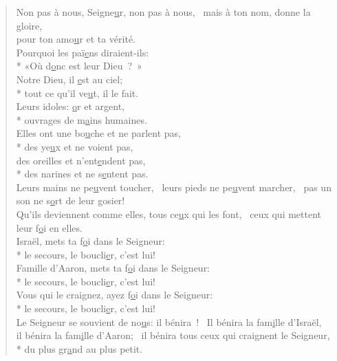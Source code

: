 \begin{verse}
Non pas à nous, Seigne\underline{u}r, non pas à nous,~\psalmstar
mais à ton nom, donne la gloire, \\
pour ton amo\underline{u}r et ta vérité. \\

Pourquoi les paï\underline{e}ns diraient-ils: \\*
«Où d\underline{o}nc est leur Dieu ? » \\

Notre Dieu, il \underline{e}st au ciel; \\*
tout ce qu’il ve\underline{u}t, il le fait. \\
Leurs idoles: \underline{o}r et argent, \\*
ouvrages de m\underline{a}ins humaines. \\

Elles ont une bo\underline{u}che et ne parlent pas, \\*
des ye\underline{u}x et ne voient pas, \\
des oreilles et n’ent\underline{e}ndent pas, \\*
des narines et ne s\underline{e}ntent pas. \\

Leurs mains ne pe\underline{u}vent toucher,~\psalmdagger
leurs pieds ne pe\underline{u}vent marcher,~\psalmstar
pas un son ne s\underline{o}rt de leur gosier! \\

Qu’ils deviennent comme elles, tous ce\underline{u}x qui les font,~\psalmstar
ceux qui mettent leur f\underline{o}i en elles. \\

Israël, mets ta f\underline{o}i dans le Seigneur: \\*
le secours, le boucli\underline{e}r, c’est lui! \\
Famille d’Aaron, mets ta f\underline{o}i dans le Seigneur: \\*
le secours, le boucli\underline{e}r, c’est lui! \\
Vous qui le craignez, ayez f\underline{o}i dans le Seigneur: \\*
le secours, le boucli\underline{e}r, c’est lui! \\

Le Seigneur se souvient de no\underline{u}s: il bénira !~\psalmstar
Il bénira la fam\underline{i}lle d’Israël, \\
il bénira la fam\underline{i}lle d’Aaron;~\psalmstar
{}il bénira tous ceux qui craignent le Seigneur, \\*
du plus gr\underline{a}nd au plus petit. \\


\end{verse}
